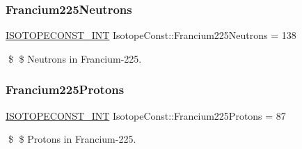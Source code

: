 \subsubsection{\texorpdfstring{Francium225\+Neutrons}{Francium225Neutrons}}
{\footnotesize\ttfamily \mbox{\hyperlink{group___isotope_const-_macros_ga5f18360b3e99483a35c32d789e62621c}{I\+S\+O\+T\+O\+P\+E\+C\+O\+N\+S\+T\+\_\+\+I\+NT}} Isotope\+Const\+::\+Francium225\+Neutrons = 138}

\$ \$ Neutrons in Francium-\/225. \mbox{\label{group___isotope_const-_francium-_fr225_ga03a07e87aadaec00c48a333607d33b89}} 
\subsubsection{\texorpdfstring{Francium225\+Protons}{Francium225Protons}}
{\footnotesize\ttfamily \mbox{\hyperlink{group___isotope_const-_macros_ga5f18360b3e99483a35c32d789e62621c}{I\+S\+O\+T\+O\+P\+E\+C\+O\+N\+S\+T\+\_\+\+I\+NT}} Isotope\+Const\+::\+Francium225\+Protons = 87}

\$ \$ Protons in Francium-\/225. 